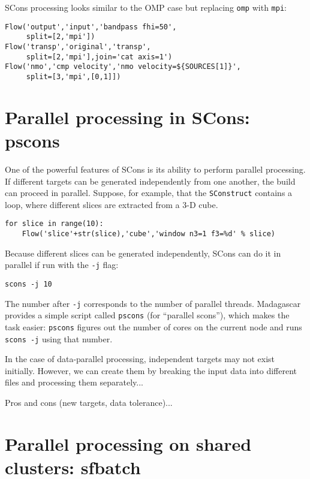 SCons processing looks similar to the OMP case but replacing \texttt{omp} with \texttt{mpi}:
\lstset{language=python,showstringspaces=false,frame=single}
\begin{lstlisting}
Flow('output','input','bandpass fhi=50',
     split=[2,'mpi'])
Flow('transp','original','transp',
     split=[2,'mpi'],join='cat axis=1')
Flow('nmo','cmp velocity','nmo velocity=${SOURCES[1]}',
     split=[3,'mpi',[0,1]])
\end{lstlisting}


\section{Parallel processing in SCons: pscons}

One of the powerful features of SCons is its ability to perform
parallel processing. If different targets can be generated
independently from one another, the build can proceed in
parallel. Suppose, for example, that the \texttt{SConstruct} contains
a loop, where different slices are extracted from a 3-D cube.
\begin{lstlisting}
for slice in range(10):
    Flow('slice'+str(slice),'cube','window n3=1 f3=%d' % slice)
\end{lstlisting}  
Because different slices can be generated independently, SCons can do it in parallel if run with the \texttt{-j} flag:
\begin{verbatim}
scons -j 10
\end{verbatim}
The number after \texttt{-j} corresponds to the number of parallel
threads. Madagascar provides a simple script called \texttt{pscons} (for
``parallel scons''), which makes the task easier: \texttt{pscons}
figures out the number of cores on the current node and runs
\texttt{scons -j} using that number.

In the case of data-parallel processing, independent targets may not
exist initially. However, we can create them by breaking the input
data into different files and processing them separately...

Pros and cons (new targets, data tolerance)...

\section{Parallel processing on shared clusters: sfbatch}




